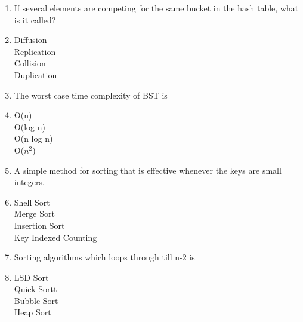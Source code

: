 \documentclass[12pt ,a4paper]{exam}
\begin{document}
\begin{enumerate}[start=1,label={\bfseries Q\arabic*)}]
	  \item If several elements are competing for the same bucket in the hash table, what is it called?
	  \item[] 
		  \begin{oneparchoices}
		  	\choice  Diffusion\\%
		  	\choice  Replication\\
		  	\choice Collision \checkmark \\
		  	\choice Duplication
		  \end{oneparchoices}
 	   	\item The worst case time complexity of BST is
 	   \item[] 
 	   \begin{oneparchoices}
 	   	\choice  O(n) \checkmark\\%
 	   	\choice  O(log n)\\
 	   	\choice O(n log n)\\
 	   	\choice O($n^2$)
 	   \end{oneparchoices}
    	\item A simple method for sorting that is effective whenever the keys are small integers.
    \item[]   
    \begin{oneparchoices}
    	\choice  Shell Sort\\
    	\choice Merge Sort\\
    	\choice Insertion Sort\\
    	\choice  Key Indexed Counting \checkmark%
    \end{oneparchoices}

    \item Sorting algorithms which loops through till n-2 is
   \item[]   
   \begin{oneparchoices}
   	\choice  LSD Sort\\%
   	\choice  Quick Sortt\\
   	\choice Bubble Sort \checkmark\\
   	\choice Heap Sort
   \end{oneparchoices}


\end{enumerate}
\end{document}
